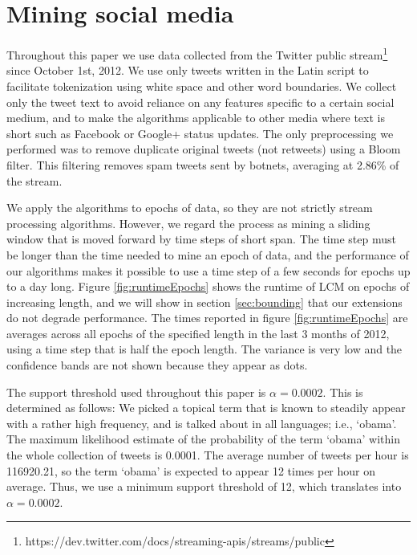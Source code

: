 \documentclass[letterpaper,12pt,titlepage,oneside,final]{book}
\begin{document}
\section{Mining social media}
\label{sec:socmine}

Throughout this paper we use data collected from the Twitter public
stream\footnote{https://dev.twitter.com/docs/streaming-apis/streams/public}
since October 1st, 2012. 
We use only tweets written in the Latin script to facilitate tokenization
using white space and other word boundaries.
We collect only the tweet text to avoid reliance on any features specific to a
certain social medium,
and to make the algorithms applicable to other media where text is short such
as Facebook or Google+ status updates.
The only preprocessing we performed was to remove duplicate original tweets
(not retweets) using a Bloom filter.
This filtering removes spam tweets sent by botnets, averaging at 2.86\% of the stream. 

We apply the algorithms to epochs of data, so they are not strictly stream
processing algorithms.
However, we regard the process as mining a sliding window that is moved
forward by time steps of short span.
The time step must be longer than the time needed to mine an epoch of data,
and the performance of our algorithms makes it possible to use a time step
of a few seconds for epochs up to a day long.
Figure \ref{fig:runtimeEpochs} shows the runtime of LCM on epochs of
increasing length, and we will show in section \ref{sec:bounding} that our
extensions do not degrade performance.
The times reported in figure \ref{fig:runtimeEpochs} are averages across all
epochs of the specified length in the last 3 months of 2012, %
using a time step that is half the epoch length.
The variance is very low and the confidence bands are not shown because they
appear as dots.%

The support threshold used throughout this paper %
is $\alpha=0.0002$.
This is determined as follows: We picked a topical term that is known to
steadily appear with a rather high frequency, and is talked about in all
languages; i.e., `obama'.
The maximum likelihood estimate of the probability of the term `obama' within
the whole collection of tweets is 0.0001.
The average number of tweets per hour is 116920.21, so the term `obama' is
expected to appear 12 times per hour on average.
Thus, we use a minimum support threshold of 12, which translates into
$\alpha = 0.0002$.
\end{document}
